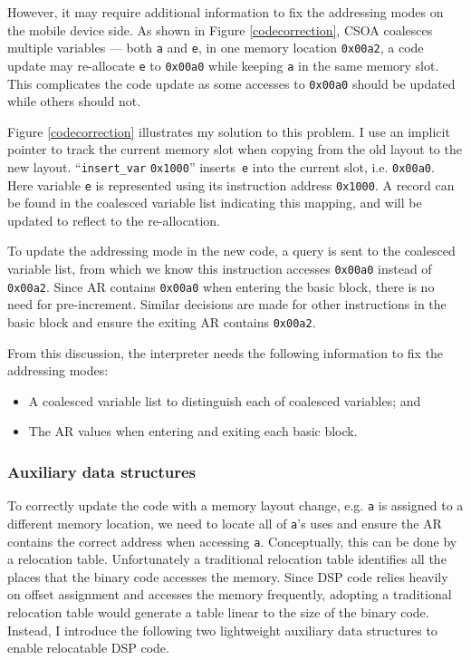 However, it may require additional information to fix the addressing modes on the mobile device side. As shown in Figure \ref{codecorrection}, CSOA coalesces multiple variables --- both {\tt a} and {\tt e}, in one memory location {\tt 0x00a2}, a code update may re-allocate {\tt e} to {\tt 0x00a0} while keeping {\tt a} in the same memory slot. This complicates the code update as some accesses to {\tt 0x00a0} should be updated while others should not.

Figure \ref{codecorrection} illustrates my solution to this problem. 
I use an implicit pointer to track the current memory slot when copying from the old layout to the new layout.  ``{\tt insert\_var} {\tt 0x1000}'' inserts~{\tt e} into the current slot, i.e. {\tt 0x00a0}. Here variable {\tt e} is represented using its instruction address {\tt 0x1000}. A record can be found in the coalesced variable list indicating this mapping, and will be updated to reflect to the re-allocation.

To update the addressing mode in the new code, a query is sent to the coalesced variable list, from which we know this instruction accesses {\tt 0x00a0} instead of {\tt 0x00a2}. Since AR contains {\tt 0x00a0} when entering the basic block, there is no need for pre-increment. Similar decisions are made for other instructions in the basic block and ensure the exiting AR contains {\tt 0x00a2}.

From this discussion, the interpreter needs the following information to fix the addressing modes:
\begin{itemize}
	\item A coalesced variable list to distinguish each of coalesced variables; and
	\item The AR values when entering and exiting each basic block.
\end{itemize}

\subsubsection{Auxiliary data structures}
To correctly update the code with a memory layout change, e.g. {\tt a} is assigned to a different memory location, we need to locate all of {\tt a}'s uses and ensure the AR contains the correct address when accessing {\tt a}. Conceptually, this can be done by a relocation table. Unfortunately a traditional relocation table identifies all the places that the binary code accesses the memory. Since DSP code relies heavily on offset assignment and accesses the memory frequently, adopting a traditional relocation table would generate a table linear to the size of the binary code. Instead, I introduce the following two lightweight auxiliary data structures to enable relocatable DSP code.

